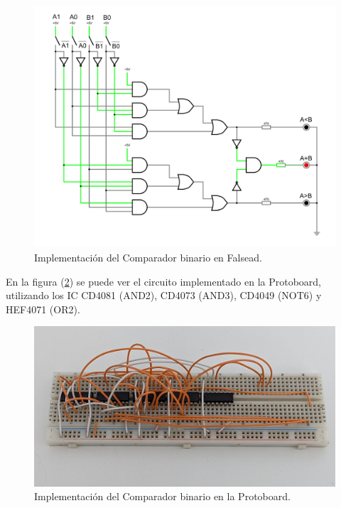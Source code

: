 \documentclass[]{informeutn}
\begin{document}
    \begin{figure}[!ht]
      \centering
      \includegraphics[width=1\textwidth]{images/ej2.png}
      \caption{Implementación del Comparador binario en Falsead.}
      \label{falstad.ej2}
    \end{figure}

    En la figura (\ref{crkt.ej2.prot}) se puede ver el circuito implementado en la Protoboard, utilizando los IC CD4081
    (AND2), CD4073 (AND3), CD4049 (NOT6) y HEF4071 (OR2).

    \begin{figure}[!ht]
      \centering
      \includegraphics[width=.8\textwidth]{pictures/prot-ej2.jpg}
      \caption{Implementación del Comparador binario en la Protoboard.}
      \label{crkt.ej2.prot}
    \end{figure}
\end{document}
